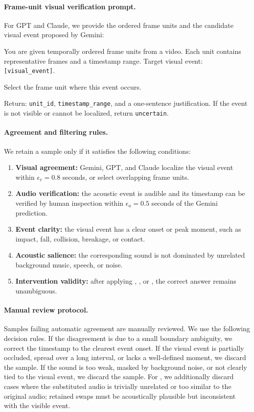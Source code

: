 \paragraph{Frame-unit visual verification prompt.}
For GPT and Claude, we provide the ordered frame units and the candidate visual event proposed by Gemini:
\begin{tcolorbox}[colback=gray!3,colframe=gray!35,boxrule=0.5pt,arc=2pt]
\small
You are given temporally ordered frame units from a video. Each unit contains representative frames and a timestamp range.  
Target visual event: \texttt{[visual\_event]}.

Select the frame unit where this event occurs. 

Return:
\texttt{unit\_id}, \texttt{timestamp\_range}, and a one-sentence justification.  
If the event is not visible or cannot be localized, return \texttt{uncertain}.
\end{tcolorbox}

\paragraph{Agreement and filtering rules.}
We retain a sample only if it satisfies the following conditions:
\begin{enumerate}[leftmargin=1.5em,itemsep=2pt,topsep=2pt]
    \item \textbf{Visual agreement:} Gemini, GPT, and Claude localize the visual event within $\epsilon_v = 0.8$ seconds, or select overlapping frame units.
    \item \textbf{Audio verification:} the acoustic event is audible and its timestamp can be verified by human inspection within $\epsilon_a = 0.5$ seconds of the Gemini prediction.
    \item \textbf{Event clarity:} the visual event has a clear onset or peak moment, such as impact, fall, collision, breakage, or contact.
    \item \textbf{Acoustic salience:} the corresponding sound is not dominated by unrelated background music, speech, or noise.
    \item \textbf{Intervention validity:} after applying \shift, \mute, or \swap, the correct answer remains unambiguous.
\end{enumerate}

\paragraph{Manual review protocol.}
Samples failing automatic agreement are manually reviewed. We use the following decision rules. If the disagreement is due to a small boundary ambiguity, we correct the timestamp to the clearest event onset. If the visual event is partially occluded, spread over a long interval, or lacks a well-defined moment, we discard the sample. If the sound is too weak, masked by background noise, or not clearly tied to the visual event, we discard the sample. For \swap, we additionally discard cases where the substituted audio is trivially unrelated or too similar to the original audio; retained swaps must be acoustically plausible but inconsistent with the visible event.



